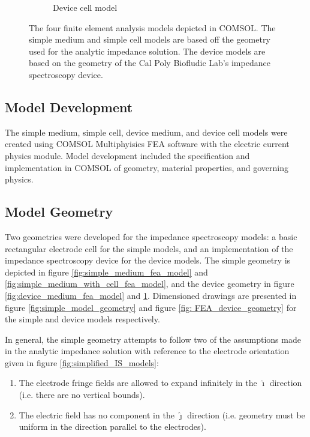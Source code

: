 \begin{figure}[h]
\begin{subfigure}[b]{0.45\textwidth}
        \caption{Device cell model}
        \label{fig:device_cell_fea_model}
    \end{subfigure}
    \caption[FEA models]{The four finite element analysis models depicted in COMSOL. The simple medium and simple cell models are based off the geometry used for the analytic impedance solution. The device models are based on the geometry of the Cal Poly Biofludic Lab's impedance spectroscopy device.}
    \label{fig:FEA_models}
\end{figure}


\subsection{Model Development}
\par The simple medium, simple cell, device medium, and device cell models were created using COMSOL Multiphyisics FEA software with the electric current physics module. Model development included the specification and implementation in COMSOL of geometry, material properties, and governing physics.

\subsection*{Model Geometry}
\par Two geometries were developed for the impedance spectroscopy models: a basic rectangular electrode cell for the simple models, and an implementation of the impedance spectroscopy device for the device models. The simple geometry is depicted in figure \ref{fig:simple_medium_fea_model} and \ref{fig:simple_medium_with_cell_fea_model}, and the device geometry in figure \ref{fig:device_medium_fea_model} and \ref{fig:device_cell_fea_model}. Dimensioned drawings are presented in figure \ref{fig:simple_model_geometry} and figure \ref{fig: FEA_device_geometry} for the simple and device models respectively.

\par In general, the simple geometry attempts to follow two of the assumptions made in the analytic impedance solution with reference to the electrode orientation given in figure \ref{fig:simplified_IS_models}:
\begin{enumerate}
    \item The electrode fringe fields are allowed to expand infinitely in the $\hat{\boldsymbol\imath}$ direction (i.e. there are no vertical bounds).
    \item The electric field has no component in the $\hat{\boldsymbol\jmath}$ direction (i.e. geometry must be uniform in the direction parallel to the electrodes).
\end{enumerate}

